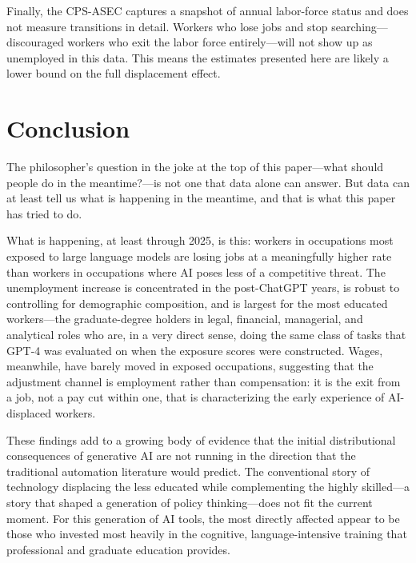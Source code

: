 \documentclass[11pt]{article}
\begin{document}
Finally, the CPS-ASEC captures a snapshot of annual labor-force status and does not measure transitions in detail. Workers who lose jobs and stop searching---discouraged workers who exit the labor force entirely---will not show up as unemployed in this data. This means the estimates presented here are likely a lower bound on the full displacement effect.

\section{Conclusion}
\label{sec:conclusion}

The philosopher's question in the joke at the top of this paper---what should people do in the meantime?---is not one that data alone can answer. But data can at least tell us what is happening in the meantime, and that is what this paper has tried to do.

What is happening, at least through 2025, is this: workers in occupations most exposed to large language models are losing jobs at a meaningfully higher rate than workers in occupations where AI poses less of a competitive threat. The unemployment increase is concentrated in the post-ChatGPT years, is robust to controlling for demographic composition, and is largest for the most educated workers---the graduate-degree holders in legal, financial, managerial, and analytical roles who are, in a very direct sense, doing the same class of tasks that GPT-4 was evaluated on when the exposure scores were constructed. Wages, meanwhile, have barely moved in exposed occupations, suggesting that the adjustment channel is employment rather than compensation: it is the exit from a job, not a pay cut within one, that is characterizing the early experience of AI-displaced workers.

These findings add to a growing body of evidence \parencite{hosseini2025seniority,brynjolfsson2025canaries} that the initial distributional consequences of generative AI are not running in the direction that the traditional automation literature would predict. The conventional story of technology displacing the less educated while complementing the highly skilled---a story that shaped a generation of policy thinking---does not fit the current moment. For this generation of AI tools, the most directly affected appear to be those who invested most heavily in the cognitive, language-intensive training that professional and graduate education provides.
\end{document}
